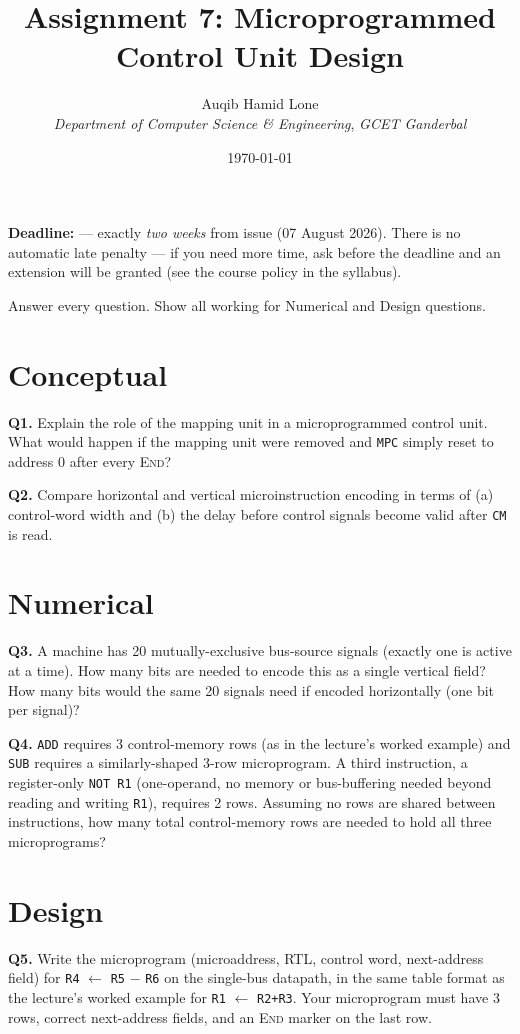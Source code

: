 \documentclass[11pt]{article}
\title{Assignment 7: Microprogrammed Control Unit Design}
\author{Auqib Hamid Lone\\[0.3em]
  \emph{Department of Computer Science \& Engineering}, \emph{GCET Ganderbal}}
\date{\today}
\begin{document}
\maketitle

\noindent\textbf{Deadline:}  --- exactly \emph{two weeks} from issue (07 August 2026). There is no automatic late penalty --- if you need more time, ask before the deadline and an extension will be granted (see the course policy in the syllabus).

\noindent Answer every question. Show all working for Numerical and Design questions.

\section{Conceptual}

\textbf{Q1.} Explain the role of the mapping unit in a microprogrammed control unit. What would happen if the mapping unit were removed and \texttt{MPC} simply reset to address 0 after every \textsc{End}?

\textbf{Q2.} Compare horizontal and vertical microinstruction encoding in terms of (a) control-word width and (b) the delay before control signals become valid after \texttt{CM} is read.

\section{Numerical}

\textbf{Q3.} A machine has 20 mutually-exclusive bus-source signals (exactly one is active at a time). How many bits are needed to encode this as a single vertical field? How many bits would the same 20 signals need if encoded horizontally (one bit per signal)?

\textbf{Q4.} \texttt{ADD} requires 3 control-memory rows (as in the lecture's worked example) and \texttt{SUB} requires a similarly-shaped 3-row microprogram. A third instruction, a register-only \texttt{NOT R1} (one-operand, no memory or bus-buffering needed beyond reading and writing \texttt{R1}), requires 2 rows. Assuming no rows are shared between instructions, how many total control-memory rows are needed to hold all three microprograms?

\section{Design}

\textbf{Q5.} Write the microprogram (microaddress, RTL, control word, next-address field) for \texttt{R4} $\gets$ \texttt{R5} $-$ \texttt{R6} on the single-bus datapath, in the same table format as the lecture's worked example for \texttt{R1} $\gets$ \texttt{R2+R3}. Your microprogram must have 3 rows, correct next-address fields, and an \textsc{End} marker on the last row.
\end{document}
